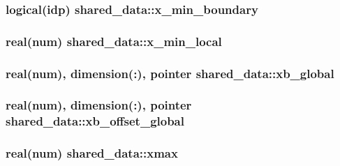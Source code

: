 \subsubsection[{\texorpdfstring{x\+\_\+min\+\_\+boundary}{x_min_boundary}}]{\setlength{\rightskip}{0pt plus 5cm}logical(idp) shared\+\_\+data\+::x\+\_\+min\+\_\+boundary}\hypertarget{namespaceshared__data_a1fb2edce254dcc9943d5a9d227ea3c58}{}\label{namespaceshared__data_a1fb2edce254dcc9943d5a9d227ea3c58}
\subsubsection[{\texorpdfstring{x\+\_\+min\+\_\+local}{x_min_local}}]{\setlength{\rightskip}{0pt plus 5cm}real(num) shared\+\_\+data\+::x\+\_\+min\+\_\+local}\hypertarget{namespaceshared__data_a4a7c4b6eb045c3017f04dc08eb5cddcd}{}\label{namespaceshared__data_a4a7c4b6eb045c3017f04dc08eb5cddcd}
\subsubsection[{\texorpdfstring{xb\+\_\+global}{xb_global}}]{\setlength{\rightskip}{0pt plus 5cm}real(num), dimension(\+:), pointer shared\+\_\+data\+::xb\+\_\+global}\hypertarget{namespaceshared__data_a22e4d784058444556c04be431d584ec7}{}\label{namespaceshared__data_a22e4d784058444556c04be431d584ec7}
\subsubsection[{\texorpdfstring{xb\+\_\+offset\+\_\+global}{xb_offset_global}}]{\setlength{\rightskip}{0pt plus 5cm}real(num), dimension(\+:), pointer shared\+\_\+data\+::xb\+\_\+offset\+\_\+global}\hypertarget{namespaceshared__data_a5fe1885535a9b60b53e19525797f551a}{}\label{namespaceshared__data_a5fe1885535a9b60b53e19525797f551a}
\subsubsection[{\texorpdfstring{xmax}{xmax}}]{\setlength{\rightskip}{0pt plus 5cm}real(num) shared\+\_\+data\+::xmax}\hypertarget{namespaceshared__data_abf7145e6fa97e6f2650f0c09c8818b58}{}\label{namespaceshared__data_abf7145e6fa97e6f2650f0c09c8818b58}
